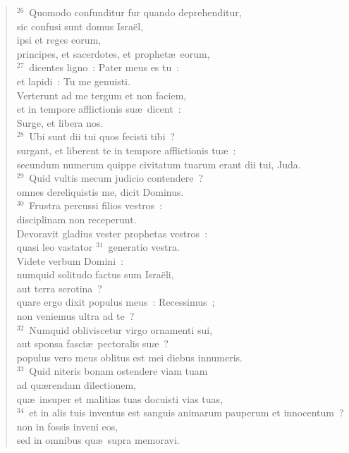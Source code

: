\begin{flushleft}\begin{verse}${}^{26}$~Quomodo confunditur fur quando deprehenditur,\\ sic confusi sunt domus Isra\"el,\\ ipsi et reges eorum,\\ principes, et sacerdotes, et prophet\ae\ eorum,\\
${}^{27}$~dicentes ligno~: Pater meus es tu~:\\ et lapidi~: Tu me genuisti.\\ Verterunt ad me tergum et non faciem,\\ et in tempore afflictionis su\ae\ dicent~:\\ Surge, et libera nos.\\
${}^{28}$~Ubi sunt dii tui quos fecisti tibi~?\\ surgant, et liberent te in tempore afflictionis tu\ae~:\\ secundum numerum quippe civitatum tuarum erant dii tui, Juda.\\
${}^{29}$~Quid vultis mecum judicio contendere~?\\ omnes dereliquistis me, dicit Dominus.\\
${}^{30}$~Frustra percussi filios vestros~:\\ disciplinam non receperunt.\\ Devoravit gladius vester prophetas vestros~:\\ quasi leo vastator
${}^{31}$~generatio vestra.\\ Videte verbum Domini~:\\ numquid solitudo factus sum Isra\"eli,\\ aut terra serotina~?\\ quare ergo dixit populus meus~: Recessimus~;\\ non veniemus ultra ad te~?\\
${}^{32}$~Numquid obliviscetur virgo ornamenti sui,\\ aut sponsa fasci\ae\ pectoralis su\ae~?\\ populus vero meus oblitus est mei diebus innumeris.\\
${}^{33}$~Quid niteris bonam ostendere viam tuam\\ ad qu\ae rendam dilectionem,\\ qu\ae\ insuper et malitias tuas docuisti vias tuas,\\
${}^{34}$~et in alis tuis inventus est sanguis animarum pauperum et innocentum~?\\ non in fossis inveni eos,\\ sed in omnibus qu\ae\ supra memoravi.\\

\end{verse}
\end{flushleft}

